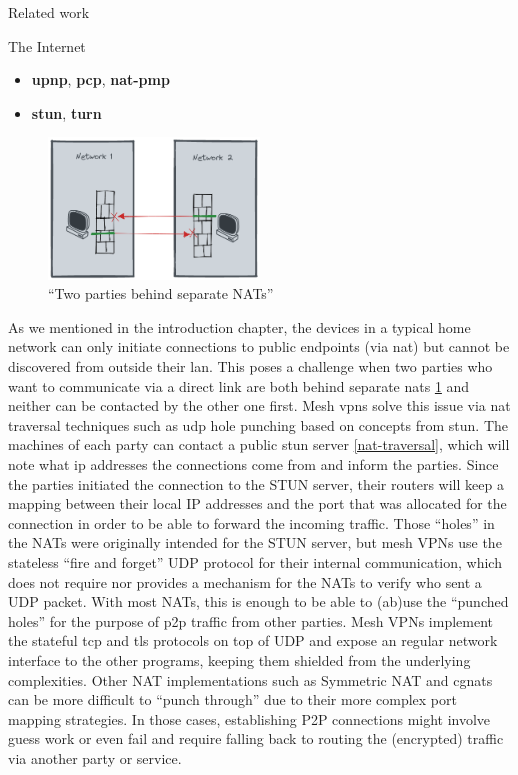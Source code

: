\begin{frame}[fragile]{Related work}
\begin{block}{The Internet}
\begin{itemize}
\begin{itemize}
    \begin{itemize}
    \tightlist
    \item
      \textbf{\acrfull{upnp}}, \textbf{\acrfull{pcp}},
      \textbf{\acrfull{nat-pmp}}
    \item
      \textbf{\acrfull{stun}}, \textbf{\acrfull{turn}}
    \end{itemize}
  \end{itemize}
\end{itemize}

\begin{figure}
\centering
\includegraphics[width=0.5\textwidth,height=0.25\textheight]{thesis/../figures/nat-intro.png}
\caption{``Two parties behind separate NATs''\label{nat-intro}}
\end{figure}

As we mentioned in the introduction chapter, the devices in a typical
home network can only initiate connections to public endpoints (via
\gls{nat}) but cannot be discovered from outside their \gls{lan}. This
poses a challenge when two parties who want to communicate via a direct
link are both behind separate \glspl{nat} \ref{nat-intro} and neither
can be contacted by the other one first. Mesh \glspl{vpn} solve this
issue via \gls{nat} traversal techniques such as \gls{udp} hole punching
based on concepts from \gls{stun}. The machines of each party can
contact a public \gls{stun} server \ref{nat-traversal}, which will note
what \gls{ip} addresses the connections come from and inform the
parties. Since the parties initiated the connection to the STUN server,
their routers will keep a mapping between their local IP addresses and
the port that was allocated for the connection in order to be able to
forward the incoming traffic. Those ``holes'' in the NATs were
originally intended for the STUN server, but mesh VPNs use the stateless
``fire and forget'' UDP protocol for their internal communication, which
does not require nor provides a mechanism for the NATs to verify who
sent a UDP packet. With most NATs, this is enough to be able to (ab)use
the ``punched holes'' for the purpose of \gls{p2p} traffic from other
parties. Mesh VPNs implement the stateful \gls{tcp} and \gls{tls}
protocols on top of UDP and expose an regular network interface to the
other programs, keeping them shielded from the underlying complexities.
Other NAT implementations such as Symmetric NAT and \glspl{cgnat} can be
more difficult to ``punch through'' due to their more complex port
mapping strategies. In those cases, establishing P2P connections might
involve guess work or even fail and require falling back to routing the
(encrypted) traffic via another party or service.


\end{block}
\end{frame}

